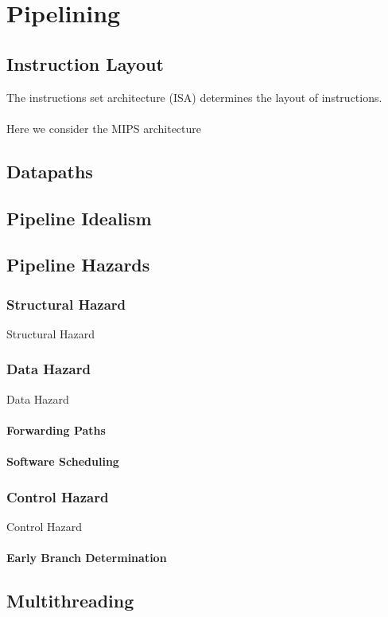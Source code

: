 \chapter{Pipelining}


\section{Instruction Layout}
The instructions set architecture (ISA) determines the layout of instructions.
\\
\\ Here we consider the MIPS architecture

\section{Datapaths}

\section{Pipeline Idealism}

\section{Pipeline Hazards}
\subsection{Structural Hazard}
\begin{definitionbox}{Structural Hazard}

\end{definitionbox}

\subsection{Data Hazard}
\begin{definitionbox}{Data Hazard}

\end{definitionbox}

\subsubsection{Forwarding Paths}
\subsubsection{Software Scheduling}


\subsection{Control Hazard}
\begin{definitionbox}{Control Hazard}
    
\end{definitionbox}
\subsubsection{Early Branch Determination}

\section{Multithreading}



